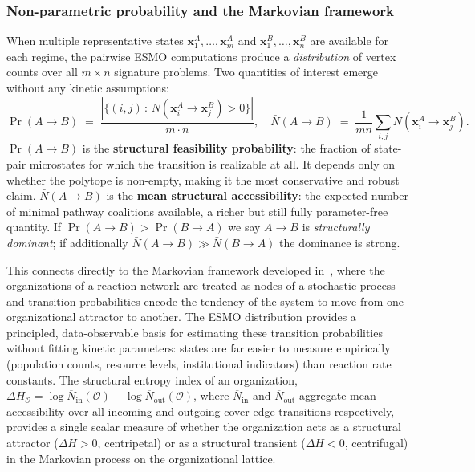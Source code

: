 \subsubsection*{Non-parametric probability and the Markovian framework}

When multiple representative states $\mathbf{x}^A_1, \ldots,
\mathbf{x}^A_m$ and $\mathbf{x}^B_1, \ldots, \mathbf{x}^B_n$ are
available for each regime, the pairwise ESMO computations produce a
\emph{distribution} of vertex counts over all $m \times n$ signature
problems.  Two quantities of interest emerge without any kinetic
assumptions:
\begin{equation}
  \Pr(A \to B) \;=\; \frac{|\{(i,j)\,:\, N(\mathbf{x}^A_i \to \mathbf{x}^B_j) > 0\}|}{m \cdot n},
  \quad
  \bar{N}(A \to B) \;=\; \frac{1}{mn}\sum_{i,j} N(\mathbf{x}^A_i \to \mathbf{x}^B_j).
  \label{eq:esmo_prob}
\end{equation}
$\Pr(A \to B)$ is the \textbf{structural feasibility probability}: the
fraction of state-pair microstates for which the transition is realizable
at all.  It depends only on whether the polytope is non-empty, making it
the most conservative and robust claim.  $\bar{N}(A \to B)$ is the
\textbf{mean structural accessibility}: the expected number of minimal
pathway coalitions available, a richer but still fully parameter-free
quantity.  If $\Pr(A \to B) > \Pr(B \to A)$ we say $A \to B$ is
\emph{structurally dominant}; if additionally $\bar{N}(A \to B) \gg
\bar{N}(B \to A)$ the dominance is strong.

This connects directly to the Markovian framework developed
in~\citet{veloz2023markovian}, where the organizations of a reaction
network are treated as nodes of a stochastic process and transition
probabilities encode the tendency of the system to move from one
organizational attractor to another.  The ESMO distribution provides a
principled, data-observable basis for estimating these transition
probabilities without fitting kinetic parameters: states are far easier to
measure empirically (population counts, resource levels, institutional
indicators) than reaction rate constants.
The structural entropy index of an organization,
$\Delta H_{\mathcal{O}} = \log \overline{N}_{\text{in}}(\mathcal{O}) -
\log \overline{N}_{\text{out}}(\mathcal{O})$,
where $\overline{N}_{\text{in}}$ and $\overline{N}_{\text{out}}$ aggregate
mean accessibility over all incoming and outgoing cover-edge transitions
respectively, provides a single scalar measure of whether the organization
acts as a structural attractor ($\Delta H > 0$, centripetal) or as a
structural transient ($\Delta H < 0$, centrifugal) in the Markovian process
on the organizational lattice.



